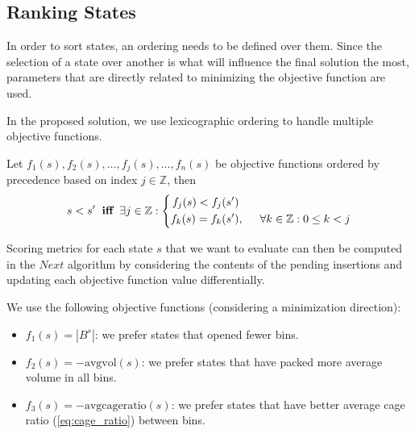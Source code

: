 



\subsection{Ranking States}
\label{ssec:scoring_states}%
In order to sort states, an ordering needs to be defined over them.
Since the selection of a state over another is what will influence the final solution the most, parameters that are directly related to minimizing the objective function are used.


In the proposed solution, we use lexicographic ordering to handle multiple objective functions.
\begin{definition}
    \label{def:lexicographic_ordering}
    Let $f_1(s), f_2(s), \dots, f_j(s), \dots, f_n(s)$ be objective functions ordered by precedence based on index $j \in \mathbb{Z}$, then 
    \begin{equation*}
        s < s^\prime \hspace{.2cm} \textbf{iff} \hspace{.2cm} \exists j \in \mathbb{Z} : \left\{
            \begin{aligned}
                f_j(s) < f_j(s^\prime) & \\
                f_k(s) = f_k(s^\prime) &,\hspace{.5cm} \forall k \in \mathbb{Z} : 0 \le k < j 
            \end{aligned}
        \right.
    \end{equation*}
\end{definition}

Scoring metrics for each state $s$ that we want to evaluate can then be computed in the $Next$ algorithm by considering the contents of the pending insertions and updating each objective function value differentially.

We use the following objective functions (considering a minimization direction):
\begin{itemize}
    \item $f_1(s) = |B^s|$: we prefer states that opened fewer bins.
    \item $f_2(s) = -\text{avgvol}(s)$: we prefer states that have packed more average volume in all bins.
    \item $f_3(s) = -\text{avgcageratio}(s)$: we prefer states that have better average cage ratio (\cref{eq:cage_ratio}) between bins.
\end{itemize}

